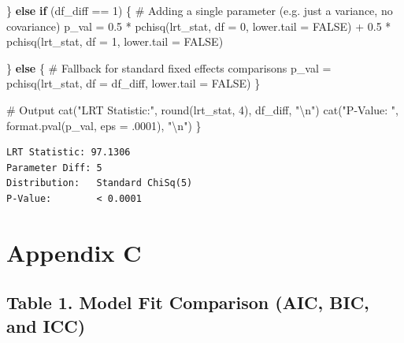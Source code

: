 \documentclass[
  12pt,
]{article}
\newenvironment{Shaded}{\begin{snugshade}}{\end{snugshade}}
\newcommand{\AttributeTok}[1]{\textcolor[rgb]{0.40,0.45,0.13}{#1}}
\newcommand{\CommentTok}[1]{\textcolor[rgb]{0.37,0.37,0.37}{#1}}
\newcommand{\ConstantTok}[1]{\textcolor[rgb]{0.56,0.35,0.01}{#1}}
\newcommand{\ControlFlowTok}[1]{\textcolor[rgb]{0.00,0.23,0.31}{\textbf{#1}}}
\newcommand{\DecValTok}[1]{\textcolor[rgb]{0.68,0.00,0.00}{#1}}
\newcommand{\FloatTok}[1]{\textcolor[rgb]{0.68,0.00,0.00}{#1}}
\newcommand{\FunctionTok}[1]{\textcolor[rgb]{0.28,0.35,0.67}{#1}}
\newcommand{\NormalTok}[1]{\textcolor[rgb]{0.00,0.23,0.31}{#1}}
\newcommand{\OtherTok}[1]{\textcolor[rgb]{0.00,0.23,0.31}{#1}}
\newcommand{\SpecialCharTok}[1]{\textcolor[rgb]{0.37,0.37,0.37}{#1}}
\newcommand{\StringTok}[1]{\textcolor[rgb]{0.13,0.47,0.30}{#1}}
\begin{document}
\begin{Shaded}
\begin{Highlighting}[]
\NormalTok{  \} }\ControlFlowTok{else} \ControlFlowTok{if}\NormalTok{ (df\_diff }\SpecialCharTok{==} \DecValTok{1}\NormalTok{) \{}
    \CommentTok{\# Adding a single parameter (e.g. just a variance, no covariance)}
\NormalTok{    p\_val }\OtherTok{=} \FloatTok{0.5} \SpecialCharTok{*} \FunctionTok{pchisq}\NormalTok{(lrt\_stat, }\AttributeTok{df =} \DecValTok{0}\NormalTok{, }\AttributeTok{lower.tail =} \ConstantTok{FALSE}\NormalTok{) }\SpecialCharTok{+} 
      \FloatTok{0.5} \SpecialCharTok{*} \FunctionTok{pchisq}\NormalTok{(lrt\_stat, }\AttributeTok{df =} \DecValTok{1}\NormalTok{, }\AttributeTok{lower.tail =} \ConstantTok{FALSE}\NormalTok{)}
    
\NormalTok{  \} }\ControlFlowTok{else}\NormalTok{ \{}
    \CommentTok{\# Fallback for standard fixed effects comparisons}
\NormalTok{    p\_val }\OtherTok{=} \FunctionTok{pchisq}\NormalTok{(lrt\_stat, }\AttributeTok{df =}\NormalTok{ df\_diff, }\AttributeTok{lower.tail =} \ConstantTok{FALSE}\NormalTok{)}
\NormalTok{  \}}
  
  \CommentTok{\# Output}
  \FunctionTok{cat}\NormalTok{(}\StringTok{"LRT Statistic:"}\NormalTok{, }\FunctionTok{round}\NormalTok{(lrt\_stat, }\DecValTok{4}\NormalTok{),  df\_diff, }\StringTok{"}\SpecialCharTok{\textbackslash{}n}\StringTok{"}\NormalTok{)}
  \FunctionTok{cat}\NormalTok{(}\StringTok{"P{-}Value:       "}\NormalTok{, }\FunctionTok{format.pval}\NormalTok{(p\_val, }\AttributeTok{eps =}\NormalTok{ .}\DecValTok{0001}\NormalTok{), }\StringTok{"}\SpecialCharTok{\textbackslash{}n}\StringTok{"}\NormalTok{)}
\NormalTok{  \}}
\end{Highlighting}
\end{Shaded}

\begin{verbatim}
LRT Statistic: 97.1306 
Parameter Diff: 5 
Distribution:   Standard ChiSq(5) 
P-Value:        < 0.0001 
\end{verbatim}

\newpage

\section{Appendix C}\label{appendix-c}

\subsection*{Table 1. Model Fit Comparison (AIC, BIC, and
ICC)}\label{table-1.-model-fit-comparison-aic-bic-and-icc}
\end{document}
